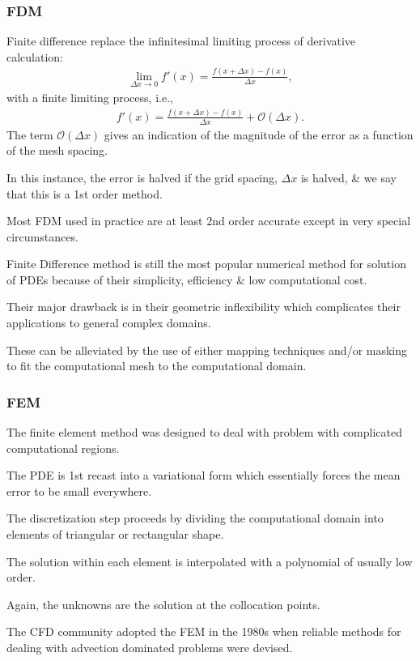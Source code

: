 \documentclass{article}
\begin{document}
\subsubsection{FDM}
Finite difference replace the infinitesimal limiting process of derivative calculation:
\begin{align*}
	\lim_{\Delta x\to 0} f'(x) = \frac{f(x + \Delta x) - f(x)}{\Delta x},
\end{align*}
with a finite limiting process, i.e.,
\begin{align*}
	f'(x) = \frac{f(x + \Delta x) - f(x)}{\Delta x} + \mathcal{O}(\Delta x).
\end{align*}
The term $\mathcal{O}(\Delta x)$ gives an indication of the magnitude of the error as a function of the mesh spacing.

In this instance, the error is halved if the grid spacing, $\Delta x$ is halved, \& we say that this is a 1st order method.

Most FDM used in practice are at least 2nd order accurate except in very special circumstances.

Finite Difference method is still the most popular numerical method for solution of PDEs because of their simplicity, efficiency \& low computational cost.

Their major drawback is in their geometric inflexibility which complicates their applications to general complex domains.

These can be alleviated by the use of either mapping techniques and/or masking to fit the computational mesh to the computational domain. 

\subsubsection{FEM}
The finite element method was designed to deal with problem with complicated computational regions.

The PDE is 1st recast into a variational form which essentially forces the mean error to be small everywhere.

The discretization step proceeds by dividing the computational domain into elements of triangular or rectangular shape.

The solution within each element is interpolated with a polynomial of usually low order.

Again, the unknowns are the solution at the collocation points.

The CFD community adopted the FEM in the 1980s when reliable methods for dealing with advection dominated problems were devised.
\end{document}
